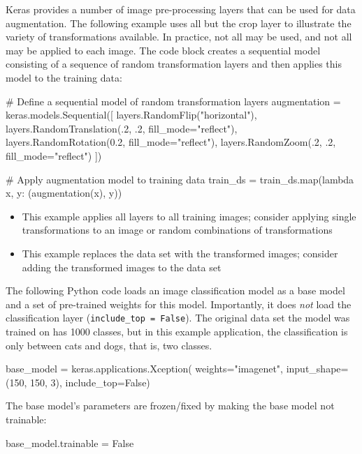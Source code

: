 Keras provides a number of image pre-processing layers that can be used for data augmentation. The following example uses all but the crop layer to illustrate the variety of transformations available. In practice, not all may be used, and not all may be applied to each image. The code block creates a sequential model consisting of a sequence of random transformation layers and then applies this model to the training data:

\begin{pythoncode}
# Define a sequential model of random transformation layers
augmentation = keras.models.Sequential([
    layers.RandomFlip("horizontal"),
    layers.RandomTranslation(.2, .2, fill_mode="reflect"),
    layers.RandomRotation(0.2, fill_mode="reflect"),
    layers.RandomZoom(.2, .2, fill_mode="reflect")
])

# Apply augmentation model to training data
train_ds = train_ds.map(lambda x, y: (augmentation(x), y))
\end{pythoncode}

\begin{infobox}
\begin{itemize}
   \item This example applies all layers to all training images; consider applying single transformations to an image or random combinations of transformations
   \item This example replaces the data set with the transformed images; consider adding the transformed images to the data set
\end{itemize}
\end{infobox}

The following Python code loads an image classification model as a base model and a set of pre-trained weights for this model. Importantly, it does \emph{not} load the classification layer (\small\texttt{include\_top = False}\normalsize). The original data set the model was trained on has 1000 classes, but in this example application, the classification is only between cats and dogs, that is, two classes.
 
\begin{pythoncode}
base_model = keras.applications.Xception(
    weights="imagenet",
    input_shape=(150, 150, 3),
    include_top=False)
\end{pythoncode}

The base model's parameters are frozen/fixed by making the base model not trainable:
\begin{pythoncode}
base_model.trainable = False
\end{pythoncode}

